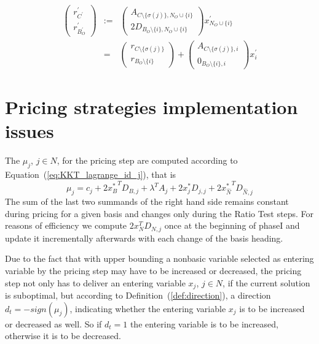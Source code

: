 \documentclass[a4paper]{article}
\begin{document}
\begin{eqnarray}
\left(
\begin{array}{c}
r_{C^{\prime}}^{\prime} \\
\hline
r_{B_{O}^{\prime}}^{\prime}
\end{array}
\right)
&:=&
\left(
\begin{array}{c}
A_{C \setminus \{\sigma(j)\}, N_{O} \cup \{i\}} \\
\hline
2D_{B_{O} \setminus \{i\}, N_{O} \cup \{i\}}
\end{array}
\right)
x_{N_{O} \cup \{i\}}^{\prime} \\
&=&
\left(
\begin{array}{c}
r_{C \setminus \{\sigma(j)\}} \\
\hline
r_{B_{O} \setminus \{i\}}
\end{array}
\right)
+
\left(
\begin{array}{c}
A_{C \setminus \{\sigma(j)\}, i} \\
\hline
0_{B_{O} \setminus \{i\}, i}
\end{array}
\right)
x_{i}^{\prime}
\end{eqnarray}


\section{Pricing strategies implementation issues}
The $\mu_{j}$, $j \in N$, for the pricing step are computed according to
Equation~(\ref{eq:KKT_lagrange_id_j}),
that is
\begin{equation}
\mu_{j}=
  c_{j} + 2{x_{B}^{*}}^{T}D_{B,j}
  +\lambda^{T} A_{j}
  + 2x_{j}^{*}D_{j,j}
  + 2{x_{\hat{N}}^{*}}^{T}D_{\hat{N},j}
\end{equation}
The sum of the last two summands of the right hand side remains constant
during pricing for a given basis and changes only during the Ratio Test steps.
For reasons of efficiency we compute $2x_{N}^{T}D_{N,j}$ once at the
beginning of phaseI and update it incrementally afterwards with each change
of the basis heading.

Due to the fact that with upper bounding a nonbasic variable selected 
as entering variable by the 
pricing step may have to be increased or decreased, 
the pricing step not
only has to deliver an entering variable $x_{j}$, $j \in N$, if the current
solution is suboptimal, but according to Definition~(\ref{def:direction}), a
direction $d_{t}=-sign(\mu_{j})$, indicating whether the entering variable
$x_{j}$ is to be increased or decreased as well. So if $d_{t}=1$ the entering
variable is to be increased, otherwise it is to be decreased.
\end{document}
